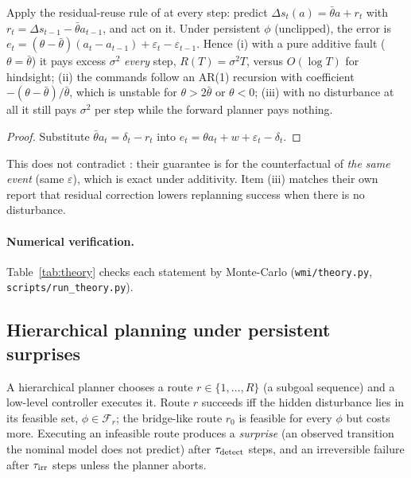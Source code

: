 \begin{theorem}\label{thm:residual}
Apply the residual-reuse rule of \citet{cwm_2611_24778} at every step: predict
$\Delta s_t(a)=\bar\theta a+r_{t}$ with $r_t=\Delta s_{t-1}-\bar\theta a_{t-1}$, and act on it. Under persistent $\phi$
(unclipped), the error is $e_t=(\theta-\bar\theta)(a_t-a_{t-1})+\varepsilon_t-\varepsilon_{t-1}$. Hence
(i) with a pure additive fault ($\theta=\bar\theta$) it pays excess $\sigma^2$ \emph{every} step, $R(T)=\sigma^2T$,
versus $O(\log T)$ for hindsight; (ii) the commands follow an AR(1) recursion with coefficient
$-(\theta-\bar\theta)/\bar\theta$, which is unstable for $\theta>2\bar\theta$ or $\theta<0$;
(iii) with no disturbance at all it still pays $\sigma^2$ per step while the forward planner pays nothing.
\end{theorem}
\begin{proof}
Substitute $\bar\theta a_t=\delta_t-r_t$ into $e_t=\theta a_t+w+\varepsilon_t-\delta_t$.
\end{proof}
This does not contradict \citet{cwm_2611_24778}: their guarantee is for the counterfactual of \emph{the same event}
(same $\varepsilon$), which is exact under additivity. Item (iii) matches their own report that residual correction
lowers replanning success when there is no disturbance.

\paragraph{Numerical verification.} Table~\ref{tab:theory} checks each statement by Monte-Carlo
(\texttt{wmi/theory.py}, \texttt{scripts/run\_theory.py}).
\begin{table}[h]\centering\scriptsize
{}
\caption{Cumulative regret $R(T)$ and $t\cdot\text{excess}_t$ late in the run (constant $\Rightarrow$ $1/t$ decay;
Theorem~\ref{thm:separation} predicts $\sigma^2d$). Mean $\pm$ s.d.\ over seeds.}
\label{tab:theory}
\end{table}

\subsection{Hierarchical planning under persistent surprises}
\label{sec:theory-hier}
A hierarchical planner chooses a route $r\in\{1,\dots,R\}$ (a subgoal sequence) and a low-level controller executes it.
Route $r$ succeeds iff the hidden disturbance lies in its feasible set, $\phi\in\mathcal F_r$; the bridge-like route
$r_0$ is feasible for every $\phi$ but costs more. Executing an infeasible route produces a \emph{surprise} (an observed
transition the nominal model does not predict) after $\tau_{\rm detect}$ steps, and an irreversible failure after
$\tau_{\rm irr}$ steps unless the planner aborts.

